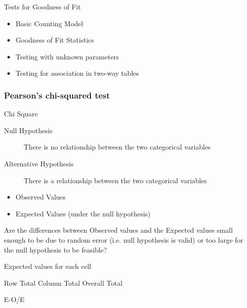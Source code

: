 \documentclass[a4]{beamer}
\begin{document}
\begin{frame}
	Tests for Goodness of Fit
	\begin{itemize}
		\item Basic Counting Model
		\item Goodness of Fit Statistics
		\item Testing with unknown parameters
		\item Testing for association in two-way tables
	\end{itemize}
	
\end{frame}
\begin{frame}
	\frametitle{Pearson's chi-squared test}
	
	Chi Square
	
	\begin{description}
		\item[Null Hypothesis]
		There is no relationship between the two categorical variables
		
		\item[Alternative Hypothesis]
		There is a relationship between the two categorical variables
	\end{description}
\end{frame}
\begin{frame}
\begin{itemize}
	\item Observed Values
	
	\item Expected Values (under the null hypothesis)
\end{itemize}
	
	
	Are the differences between Observed values and the Expected values
	small enough to be due to random error (i.e. null hypothesis is valid)
	or too large for the null hypothesis to be feasible?
\end{frame}
\begin{frame}
	Expected values for each cell
	
	Row Total Column Total
	Overall Total
	
	E-O/E
	
\end{frame}
\end{document}
